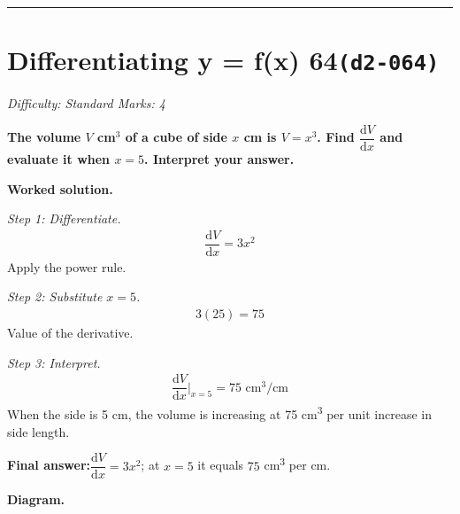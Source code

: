 \documentclass[11pt]{article}
\newcommand{\question}[1]{\par\medskip\noindent\textbf{#1}\par}
\begin{document}
\medskip\hrule

\section*{Differentiating y = f(x) 64\quad\small\texttt{(d2-064)}}
\textit{Difficulty: Standard \quad\textbar\quad Marks: 4}

\question{The volume \( V \) cm\( ^3 \) of a cube of side \( x \) cm is \( V = x^3 \). Find \( \dfrac{\mathrm{d}V}{\mathrm{d}x} \) and evaluate it when \( x = 5 \). Interpret your answer.}

\textbf{Worked solution.}

\textit{Step 1: Differentiate.}
\[\begin{gathered}
\dfrac{\mathrm{d}V}{\mathrm{d}x} = 3x^2
\end{gathered}\]
Apply the power rule.

\textit{Step 2: Substitute \( x = 5 \).}
\[\begin{gathered}
3(25) = 75
\end{gathered}\]
Value of the derivative.

\textit{Step 3: Interpret.}
\[\begin{gathered}
\dfrac{\mathrm{d}V}{\mathrm{d}x}\bigg|_{x=5} = 75 \text{ cm}^3 / \text{cm}
\end{gathered}\]
When the side is 5 cm, the volume is increasing at 75 cm\textsuperscript{3} per unit increase in side length.

\begin{answerbox}
\textbf{Final answer:}\quad \(\displaystyle  \dfrac{\mathrm{d}V}{\mathrm{d}x} = 3x^2 \); at \(\displaystyle  x = 5 \) it equals \(\displaystyle  75 \) cm\textsuperscript{3} per cm.
\end{answerbox}
\textbf{Diagram.}
\end{document}
